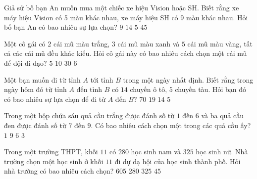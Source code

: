\begin{ex}%
	Giả sử bố bạn An muốn mua một chiếc xe hiệu Vision hoặc SH. Biết rằng xe máy hiệu Vision có 5 màu  khác nhau, xe máy hiệu SH có 9 màu khác nhau. Hỏi bố bạn An có bao nhiêu sự lựa chọn?
	\choice
	{$9$}
	{\True $14$}
	{$5$}
	{$45$}
\end{ex}

\begin{ex}%
	Một cô gái có $2$ cái mũ màu trắng, $3$ cái mũ màu xanh và $5$ cái mũ màu vàng, tất cả các cái mũ đều khác kiểu. Hỏi cô gái này có bao nhiêu cách chọn một cái mũ để đội đi dạo?
	\choice
	{$5$}
	{\True $10$}
	{$30$}
	{$6$}
\end{ex}

\begin{ex}%
	Một bạn muốn đi từ tỉnh $A$ tới tỉnh $B$ trong một ngày nhất định. Biết rằng trong ngày hôm đó từ tỉnh $A$ đến tỉnh $B$ có $14$ chuyến ô tô, $5$ chuyến tàu. Hỏi bạn đó có bao nhiêu sự lựa chọn để đi từ $A$ đến $B$?
	\choice
	{$70$}
	{\True $19$}
	{$14$}
	{$5$}
\end{ex}

\begin{ex}%
	Trong một hộp chứa sáu quả cầu trắng được đánh số từ $1$ đến $6$ và ba quả cầu đen được đánh số từ $7$ đến $9$. Có bao nhiêu cách chọn một trong các quả cầu ấy?
	\choice
	{$1$}
	{\True $9$}
	{$6$}
	{$3$}
\end{ex}


\begin{ex}%
	Trong một trường THPT, khối $11$ có $280$ học sinh nam và $325$ học sinh nữ. Nhà trường chọn một học sinh ở khối $11$ đi dự dạ hội của học sinh thành phố. Hỏi nhà trường có bao nhiêu cách chọn?
	\choice
	{\True $605$}
	{$280$}
	{$325$}
	{$45$}
\end{ex}

